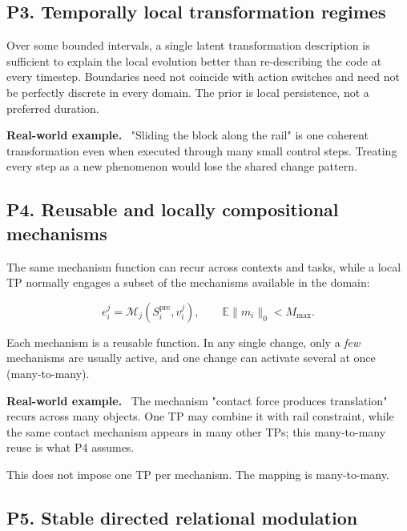 \documentclass[11pt]{article}
\newenvironment{plainword}{%
  \par\medskip\noindent\begin{minipage}{\textwidth}%
  \color{gray!75!black}\small\itshape
}{%
  \end{minipage}\par\medskip}
\newenvironment{example}{%
  \par\smallskip\noindent\begin{minipage}{\textwidth}%
  \color{teal!60!black}\small
  \textbf{\color{teal!70!black}Real-world example.}\
}{%
  \end{minipage}\par\smallskip}
\begin{document}
\subsection*{P3. Temporally local transformation regimes}

Over some bounded intervals, a single latent transformation description is sufficient to explain the local evolution better than
re-describing the code at every timestep. Boundaries need not coincide with action switches and need not be perfectly discrete in
every domain. The prior is local persistence, not a preferred duration.

\begin{example}
"Sliding the block along the rail" is one coherent transformation even when executed through many small control steps. Treating every
step as a new phenomenon would lose the shared change pattern.
\end{example}

\subsection*{P4. Reusable and locally compositional mechanisms}

The same mechanism function can recur across contexts and tasks, while a local TP normally engages a subset of the mechanisms
available in the domain:

\[
\boxed{e_i^j=\mathcal M_j(S_i^{\mathrm{pre}},v_i^j),\qquad
\mathbb E\|m_i\|_0<M_{\max}.}
\]

\begin{plainword}
Each mechanism is a reusable function. In any single change, only a \emph{few} mechanisms are usually active, and one change can
activate several at once (many-to-many).
\end{plainword}

\begin{example}
The mechanism "contact force produces translation" recurs across many objects. One TP may combine it with rail constraint, while the
same contact mechanism appears in many other TPs; this many-to-many reuse is what P4 assumes.
\end{example}

This does not impose one TP per mechanism. The mapping is many-to-many.

\subsection*{P5. Stable directed relational modulation}
\end{document}
